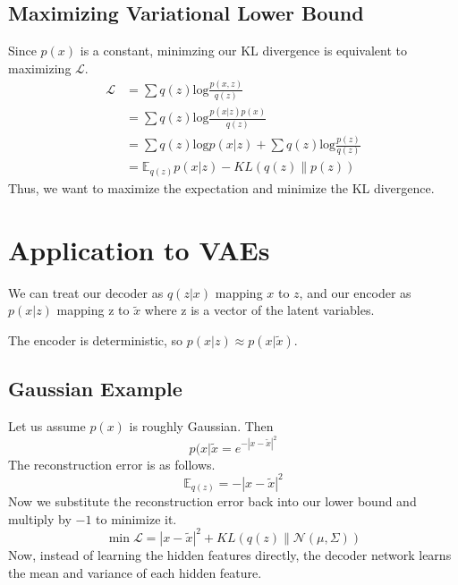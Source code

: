 \documentclass{article}
\begin{document}
\subsection{Maximizing Variational Lower Bound}
Since $p(x)$ is a constant, minimzing our KL divergence is equivalent to maximizing $\mathcal{L}$.
\begin{equation}\label{L}
\begin{aligned}
    \mathcal{L} &= \sum q(z) \text{log}\frac{p(x,z)}{q(z)}\\
    &= \sum q(z) \text{log}\frac{p(x|z)p(x)}{q(z)}\\
    &= \sum q(z)\text{log} p(x|z) + \sum q(z) \text{log}\frac{p(z)}{q(z)}\\
    &= \mathbb{E}_{q(z)}p(x|z) -KL(q(z)\parallel p(z))
\end{aligned}
\end{equation}
Thus, we want to maximize the expectation and minimize the KL divergence.

\section{Application to VAEs}
We can treat our decoder as $q(z|x)$ mapping $x$ to $z$, and our encoder as $p(x|z)$ mapping z to $\tilde{x}$ where z is a vector of the latent variables.\\
\begin{center}
\end{center}
The encoder is deterministic, so $p(x|z) \approx p(x|\tilde{x})$.
\subsection{Gaussian Example}
Let us assume $p(x)$ is roughly Gaussian. Then
\begin{equation*}
    p(x|\tilde{x} = e^{-|x-\tilde{x}|^2}
\end{equation*}
The reconstruction error is as follows.
\begin{equation*}
    \mathbb{E}_{q(z)} = -|x-\tilde{x}|^2
\end{equation*}
Now we substitute the reconstruction error back into our lower bound and multiply by $-1$ to minimize it.
\begin{equation*}
    \min \mathcal{L} = |x-\tilde{x}|^2 + KL(q(z)\parallel \mathcal{N}(\mu,\Sigma))
\end{equation*}
Now, instead of learning the hidden features directly, the decoder network learns the mean and variance of each hidden feature.
\end{document}
